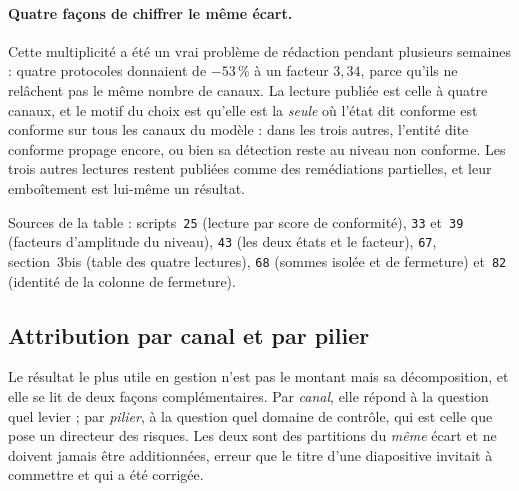 \documentclass[12pt,a4paper]{article}
\theoremstyle{definition}
\begin{document}
\paragraph{Quatre façons de chiffrer le même écart.} Cette multiplicité a été un
vrai problème de rédaction pendant plusieurs semaines : quatre protocoles donnaient
de $-53\,\%$ à un facteur $3{,}34$, parce qu'ils ne relâchent pas le même nombre
de canaux. La lecture publiée est celle à quatre canaux, et le motif du choix est
qu'elle est la \emph{seule} où l'état dit conforme est conforme sur tous les
canaux du modèle : dans les trois autres, l'entité dite conforme propage encore,
ou bien sa détection reste au niveau non conforme. Les trois autres lectures
restent publiées comme des remédiations partielles, et leur emboîtement est
lui-même un résultat.

\vspace{4pt}
\noindent Sources de la table : scripts~\texttt{25} (lecture par score de
conformité), \texttt{33} et~\texttt{39} (facteurs d'amplitude du niveau),
\texttt{43} (les deux états et le facteur), \texttt{67}, section~3bis (table des
quatre lectures), \texttt{68} (sommes isolée et de fermeture) et~\texttt{82}
(identité de la colonne de fermeture).

\subsection{Attribution par canal et par pilier}
\label{ss:attribution}

Le résultat le plus utile en gestion n'est pas le montant mais sa décomposition,
et elle se lit de deux façons complémentaires. Par \emph{canal}, elle répond à la
question \og{}quel levier\fg{} ; par \emph{pilier}, à la question \og{}quel
domaine de contrôle\fg{}, qui est celle que pose un directeur des risques. Les
deux sont des partitions du \emph{même} écart et ne doivent jamais être
additionnées, erreur que le titre d'une diapositive invitait à commettre et qui a
été corrigée.
\end{document}
